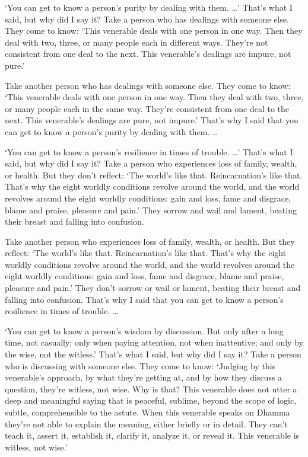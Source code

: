 \documentclass[12pt,openany]{book}%
\begin{document}
‘You can get to know a person’s purity by dealing with them. …’ That’s what I said, but why did I say it? Take a person who has dealings with someone else. They come to know: ‘This venerable deals with one person in one way. Then they deal with two, three, or many people each in different ways. They’re not consistent from one deal to the next. This venerable’s dealings are impure, not pure.’ 

Take another person who has dealings with someone else. They come to know: ‘This venerable deals with one person in one way. Then they deal with two, three, or many people each in the same way. They’re consistent from one deal to the next. This venerable’s dealings are pure, not impure.’ That’s why I said that you can get to know a person’s purity by dealing with them. … 

‘You can get to know a person’s resilience in times of trouble. …’ That’s what I said, but why did I say it? Take a person who experiences loss of family, wealth, or health. But they don’t reflect: ‘The world’s like that. Reincarnation’s like that. That’s why the eight worldly conditions revolve around the world, and the world revolves around the eight worldly conditions: gain and loss, fame and disgrace, blame and praise, pleasure and pain.’ They sorrow and wail and lament, beating their breast and falling into confusion. 

Take another person who experiences loss of family, wealth, or health. But they reflect: ‘The world’s like that. Reincarnation’s like that. That’s why the eight worldly conditions revolve around the world, and the world revolves around the eight worldly conditions: gain and loss, fame and disgrace, blame and praise, pleasure and pain.’ They don’t sorrow or wail or lament, beating their breast and falling into confusion. That’s why I said that you can get to know a person’s resilience in times of trouble. … 

‘You can get to know a person’s wisdom by discussion. But only after a long time, not casually; only when paying attention, not when inattentive; and only by the wise, not the witless.’ That’s what I said, but why did I say it? Take a person who is discussing with someone else. They come to know: ‘Judging by this venerable’s approach, by what they’re getting at, and by how they discuss a question, they’re witless, not wise. Why is that? This venerable does not utter a deep and meaningful saying that is peaceful, sublime, beyond the scope of logic, subtle, comprehensible to the astute. When this venerable speaks on Dhamma they’re not able to explain the meaning, either briefly or in detail. They can’t teach it, assert it, establish it, clarify it, analyze it, or reveal it. This venerable is witless, not wise.’ 
\end{document}
